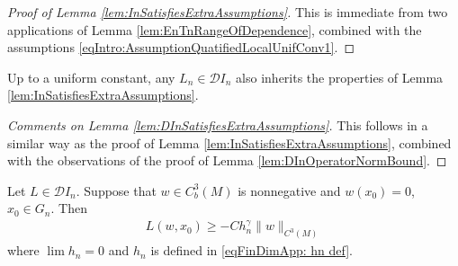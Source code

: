 \documentclass[11pt,reqno]{amsart}
\numberwithin{equation}{section}
\theoremstyle{plain}
\def\D{\mathcal D}
\def\gam{\gamma}
\begin{document}
\begin{proof}[Proof of Lemma \ref{lem:InSatisfiesExtraAssumptions}]
This is immediate from two applications of Lemma \ref{lem:EnTnRangeOfDependence}, combined with the assumptions \eqref{eqIntro:AssumptionQuatifiedLocalUnifConv1}.
\end{proof}

\begin{lem}\label{lem:DInSatisfiesExtraAssumptions}
	Up to a uniform constant, any $L_n\in \D I_n$ also inherits the properties of Lemma \ref{lem:InSatisfiesExtraAssumptions}. 
\end{lem}

\begin{proof}[Comments on Lemma \ref{lem:DInSatisfiesExtraAssumptions}]
	This follows in a similar way as the proof of Lemma \ref{lem:InSatisfiesExtraAssumptions}, combined with the observations of the proof of Lemma \ref{lem:DInOperatorNormBound}.
\end{proof}


\begin{lem}\label{lem:In has an approximate GCP}
  Let $L \in \mathcal{D}I_n$. Suppose that $w \in C^3_b(M)$ is nonnegative and $w(x_0)=0$, $x_0\in G_n$. Then
  \begin{align*}
    L(w,x_0) \geq -C h_n^\gam \|w\|_{C^3(M)}	  
  \end{align*}	  
  where $\lim h_n=0$ and $h_n$ is defined in \eqref{eqFinDimApp: hn def}.
\end{lem}
\end{document}
